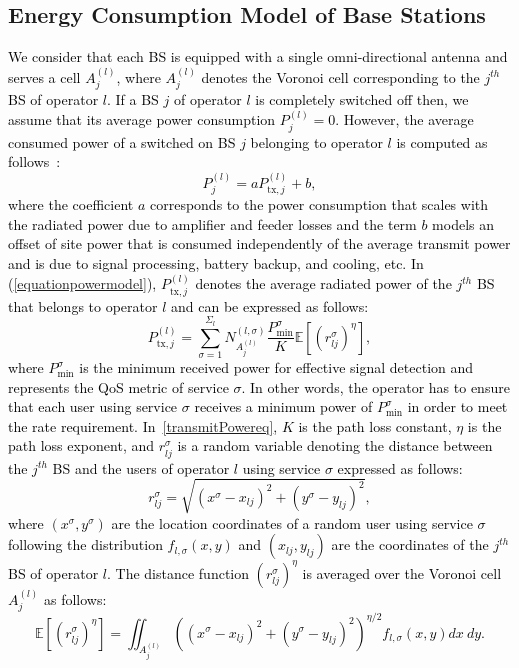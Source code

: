 \documentclass[10pt, letter, twocolumn]{IEEEtran}
\begin{document}
\subsection{Energy Consumption Model of Base Stations}
\textcolor{black}{We consider that each BS is equipped with a single omni-directional antenna and serves a cell $A_{j}^{(l)}$, where $A_{j}^{(l)}$ denotes the Voronoi cell corresponding to the $j^{th}$ BS of operator $l$. If a BS $j$ of operator $l$ is completely switched off then, we assume that its average power consumption $P_{j}^{(l)}=0$. However, the average consumed power of a switched on BS $j$ belonging to operator $l$ is computed as follows~\cite{TVTjournal1}:
\begin{equation}
P_j^{(l)}=a P_{\text{tx},j}^{(l)}+b,
\label{equationpowermodel}
\end{equation}
where the coefficient $a$ corresponds to the power consumption that scales with the radiated power due to amplifier and feeder losses and the term $b$ models an offset of site power that is consumed independently of the average transmit power and is due to signal processing, battery backup, and cooling, etc. In (\ref{equationpowermodel}), $P_{\text{tx},j}^{(l)}$ denotes the average radiated power of the $j^{th}$ BS that belongs to operator $l$ and can be expressed as follows:
\begin{equation}
\label{transmitPowereq}
P_{\text{tx},j}^{(l)}= \sum_{\sigma=1}^{\Sigma_l}N_{A_{j}^{(l)}}^{(l,\sigma)}\frac{P_{\text{min}}^{\sigma}}{K} \mathbb{E}\left[\left(r_{lj}^{\sigma}\right)^{\eta}\right],
\end{equation}
where $P_{\min}^{\sigma}$ is the minimum received power for effective signal detection and represents the QoS metric of service $\sigma$. In other words, the operator has to ensure that each user using service $\sigma$ receives a minimum power of $P_{\min}^{\sigma}$ in order to meet the rate requirement. In~\eqref{transmitPowereq}, $K$ is the path loss constant, $\eta$ is the path loss exponent, and $r_{lj}^\sigma$ is a random variable denoting the distance between the $j^{th}$ BS and the users of operator $l$ using service $\sigma$ expressed as follows:
\begin{equation}
r_{lj}^\sigma = \sqrt{(x^{\sigma} - x_{lj})^{2} + (y^{\sigma} - y_{lj})^{2}},
\end{equation}
where $(x^\sigma,y^\sigma)$ are the location coordinates of a random user using service $\sigma$ following the distribution $f_{l,\sigma}(x,y)$ and $(x_{lj},y_{lj})$ are the coordinates of the $j^{th}$ BS of operator $l$. The distance function $\left(r_{lj}^{\sigma}\right)^{\eta}$ is averaged over the Voronoi cell $A_{j}^{(l)}$ as follows:
\small
\begin{equation}\label{average_distance}
\mathbb{E}[\left(r_{lj}^{\sigma}\right)^{\eta}] = \iint_{A_{j}^{(l)}} \left( (x^{\sigma} - x_{lj})^{2} + (y^{\sigma} - y_{lj})^{2} \right)^{\eta/2}f_{l,\sigma}(x,y) dx \ dy.
\end{equation}}
\normalsize
\end{document}
